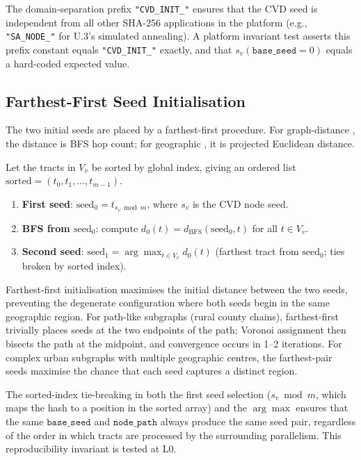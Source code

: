 The domain-separation prefix \texttt{"CVD\_INIT\_"} ensures that the CVD
seed is independent from all other SHA-256 applications in the platform
(e.g., \texttt{"SA\_NODE\_"} for U.3's simulated annealing).
A platform invariant test asserts this prefix constant equals
\texttt{"CVD\_INIT\_"} exactly, and that $s_v(\mathtt{base\_seed}=0)$
equals a hard-coded expected value.

\subsection{Farthest-First Seed Initialisation}

The two initial seeds are placed by a farthest-first procedure.
For graph-distance \cvd{}, the distance is BFS hop count; for geographic
\cvd{}, it is projected Euclidean distance.

\begin{definition}
\label{def:kfarthest}
Let the tracts in $V_v$ be sorted by global index, giving an ordered list
$\mathrm{sorted} = (t_0, t_1, \ldots, t_{m-1})$.
\begin{enumerate}
\item \textbf{First seed}: $\mathrm{seed}_0 = t_{s_v \bmod m}$, where $s_v$ is
  the CVD node seed.
\item \textbf{BFS from $\mathrm{seed}_0$}: compute $d_0(t) = d_{\mathrm{BFS}}(\mathrm{seed}_0, t)$
  for all $t \in V_v$.
\item \textbf{Second seed}: $\mathrm{seed}_1 = \arg\max_{t \in V_v} d_0(t)$
  (farthest tract from $\mathrm{seed}_0$; ties broken by sorted index).
\end{enumerate}
\end{definition}

Farthest-first initialisation maximises the initial distance between the two seeds,
preventing the degenerate configuration where both seeds begin in the same
geographic region.
For path-like subgraphs (rural county chains), farthest-first trivially places
seeds at the two endpoints of the path; Voronoi assignment then bisects the
path at the midpoint, and convergence occurs in 1--2 iterations.
For complex urban subgraphs with multiple geographic centres, the farthest-pair
seeds maximise the chance that each seed captures a distinct region.

\begin{remark}
The sorted-index tie-breaking in both the first seed selection
($s_v \bmod m$, which maps the hash to a position in the sorted array) and
the $\arg\max$ ensures that the same $\mathtt{base\_seed}$ and
$\mathtt{node\_path}$ always produce the same seed pair, regardless of the
order in which tracts are processed by the surrounding parallelism.
This reproducibility invariant is tested at L0.
\end{remark}

